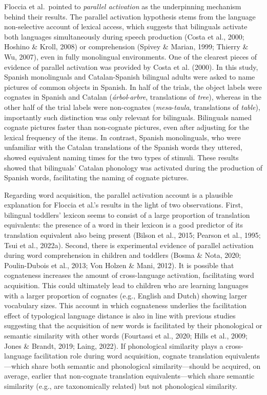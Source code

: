 \documentclass[
  man,
  floatsintext,
  colorlinks=true,linkcolor=blue,citecolor=blue,urlcolor=blue,biblatex]{apa7}
\begin{document}
Floccia et al.~pointed to \emph{parallel activation} as the underpinning
mechanism behind their results. The parallel activation hypothesis stems
from the language non-selective account of lexical access, which
suggests that bilinguals activate both languages simultaneously during
speech production (Costa et al., 2000; Hoshino \& Kroll, 2008) or
comprehension (Spivey \& Marian, 1999; Thierry \& Wu, 2007), even in
fully monolingual environments. One of the clearest pieces of evidence
of parallel activation was provided by Costa et al. (2000). In this
study, Spanish monolinguals and Catalan-Spanish bilingual adults were
asked to name pictures of common objects in Spanish. In half of the
trials, the object labels were cognates in Spanish and Catalan
(\emph{árbol}-\emph{arbre}, translations of \emph{tree}), whereas in the
other half of the trial labels were non-cognates
(\emph{mesa}-\emph{taula}, translations of \emph{table}), importantly
such distinction was only relevant for bilinguals. Bilinguals named
cognate pictures faster than non-cognate pictures, even after adjusting
for the lexical frequency of the items. In contrast, Spanish
monolinguals, who were unfamiliar with the Catalan translations of the
Spanish words they uttered, showed equivalent naming times for the two
types of stimuli. These results showed that bilinguals' Catalan
phonology was activated during the production of Spanish words,
facilitating the naming of cognate pictures.

Regarding word acquisition, the parallel activation account is a
plausible explanation for Floccia et al.'s results in the light of two
observations. First, bilingual toddlers' lexicon seems to consist of a
large proportion of translation equivalents: the presence of a word in
their lexicon is a good predictor of its translation equivalent also
being present (Bilson et al., 2015; Pearson et al., 1995; Tsui et al.,
2022a). Second, there is experimental evidence of parallel activation
during word comprehension in children and toddlers (Bosma \& Nota, 2020;
Poulin-Dubois et al., 2013; Von Holzen \& Mani, 2012). It is possible
that cognateness increases the amount of cross-language activation,
facilitating word acquisition. This could ultimately lead to children
who are learning languages with a larger proportion of cognates (e.g.,
English and Dutch) showing larger vocabulary sizes. This account in
which cognateness underlies the facilitation effect of typological
language distance is also in line with previous studies suggesting that
the acquisition of new words is facilitated by their phonological or
semantic similarity with other words (Fourtassi et al., 2020; Hills et
al., 2009; Jones \& Brandt, 2019; Laing, 2022). If phonological
similarity plays a cross-language facilitation role during word
acquisition, cognate translation equivalents---which share both semantic
and phonological similarity---should be acquired, on average, earlier
that non-cognate translation equivalents---which share semantic
similarity (e.g., are taxonomically related) but not phonological
similarity.
\end{document}

